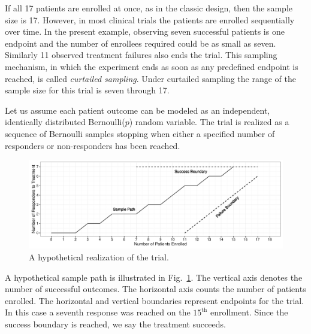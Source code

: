 \documentclass[review]{elsarticle}
\begin{document}
If all 17 patients are enrolled at once, as in the classic
design, then the sample size is 17. However, in most clinical trials the
patients are enrolled sequentially over time.
In the present example, observing seven
successful patients is one endpoint and the number of enrollees required
could be as small as seven. Similarly 11
observed treatment failures also ends the trial. This sampling mechanism, in
which the experiment ends as soon as any predefined endpoint is reached, is
called {\em curtailed sampling}. Under curtailed sampling the range of the
sample size for this trial is seven through 17.

Let us assume each patient outcome can be modeled as an independent,
identically distributed Bernoulli($p$) random variable. The trial is realized
as a sequence of Bernoulli samples stopping when either a
specified number of responders or non-responders has been reached. 

\begin{figure}[bp!]
\includegraphics[width=\textwidth]{KanePlot.pdf}
\caption{
A hypothetical realization of the trial.
}
\label{fig:kane_viz}
\end{figure}

A hypothetical sample path is illustrated in Fig.~\ref{fig:kane_viz}.
The vertical axis denotes the number of
successful outcomes. The horizontal axis counts the number of patients 
enrolled. The horizontal and vertical boundaries represent
endpoints for the trial. In this case a seventh response was reached on
the $15^{\text{th}}$ enrollment.
Since the success boundary is reached, we say the treatment succeeds.

\end{document}
